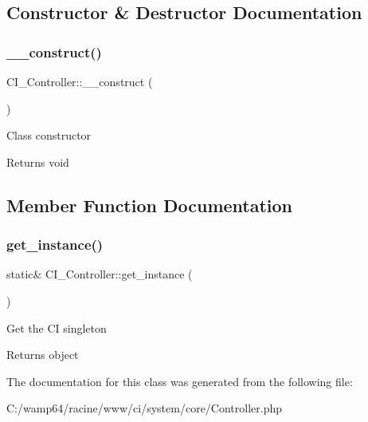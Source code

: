 \subsection{Constructor \& Destructor Documentation}
\mbox{\label{class_c_i___controller_a3934262676ae6c34d3cbd4d1065efe20}} 
\subsubsection{\texorpdfstring{\+\_\+\+\_\+construct()}{\_\_construct()}}
{\footnotesize\ttfamily C\+I\+\_\+\+Controller\+::\+\_\+\+\_\+construct (\begin{DoxyParamCaption}{ }\end{DoxyParamCaption})}

Class constructor

\begin{DoxyReturn}{Returns}
void 
\end{DoxyReturn}


\subsection{Member Function Documentation}
\mbox{\label{class_c_i___controller_aebdd6410c6d9773fff8c574c65f5cb60}} 
\subsubsection{\texorpdfstring{get\+\_\+instance()}{get\_instance()}}
{\footnotesize\ttfamily static\& C\+I\+\_\+\+Controller\+::get\+\_\+instance (\begin{DoxyParamCaption}{ }\end{DoxyParamCaption})\hspace{0.3cm}{\ttfamily [static]}}

Get the CI singleton

\begin{DoxyReturn}{Returns}
object 
\end{DoxyReturn}


The documentation for this class was generated from the following file\+:\begin{DoxyCompactItemize}
\item 
C\+:/wamp64/racine/www/ci/system/core/Controller.\+php\end{DoxyCompactItemize}
